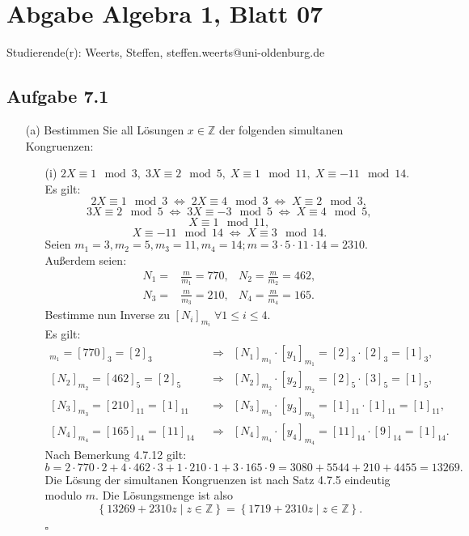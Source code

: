 \documentclass[12pt]{article}
\newcommand{\QED}{\begin{flushright} $\square$ \end{flushright}}
\newcommand{\df}{\enspace\Longrightarrow\enspace}
\newcommand{\gdw}{\;\Longleftrightarrow\;}
\begin{document}
\section*{Abgabe Algebra 1, Blatt 07}

Studierende(r): Weerts, Steffen, steffen.weerts@uni-oldenburg.de

\subsection*{Aufgabe 7.1}
\begin{enumerate}
	\item[(a)] Bestimmen Sie all Lösungen $x\in\mathbb{Z}$ der folgenden simultanen Kongruenzen:
	\begin{enumerate}
		\item[(i)] $2X\equiv 1\mod 3,\;3X\equiv 2\mod 5,\;X\equiv 1\mod 11,\;X\equiv -11\mod 14$. \\
		Es gilt:
		$$2X\equiv 1\mod 3\gdw 2X\equiv 4\mod 3\gdw X\equiv 2\mod 3,$$
		$$3X\equiv 2\mod 5\gdw 3X\equiv -3\mod 5\gdw X\equiv 4\mod 5,$$
		$$X\equiv 1\mod 11,$$
		$$X\equiv -11\mod 14\gdw X\equiv 3\mod 14.$$
		Seien $m_1=3,m_2=5,m_3=11,m_4=14;m=3\cdot 5\cdot 11\cdot 14=2310$. \\
		Außerdem seien:
		\begin{align*}
			N_1=&\frac{m}{m_1}=770, &N_2=\frac{m}{m_2}=462, \\
			N_3=&\frac{m}{m_3}=210, &N_4=\frac{m}{m_4}=165.
		\end{align*}
		Bestimme nun Inverse zu $[N_i]_{m_i}\;\forall 1\leq i\leq 4$. \\
		Es gilt:
		\begin{align*}
			[N_1]_{m_1}=[770]_3=[2]_3&\df[N_1]_{m_1}\cdot[y_1]_{m_1}=[2]_3\cdot[2]_3=[1]_3, \\
			[N_2]_{m_2}=[462]_5=[2]_5&\df[N_2]_{m_2}\cdot[y_2]_{m_2}=[2]_5\cdot[3]_5=[1]_5, \\
			[N_3]_{m_3}=[210]_{11}=[1]_{11}&\df[N_3]_{m_3}\cdot[y_3]_{m_3}=[1]_{11}\cdot[1]_{11}=[1]_{11}, \\
			[N_4]_{m_4}=[165]_{14}=[11]_{14}&\df[N_4]_{m_4}\cdot[y_4]_{m_4}=[11]_{14}\cdot[9]_{14}=[1]_{14}.
		\end{align*}
		Nach Bemerkung 4.7.12 gilt:
		$$b=2\cdot770\cdot2+4\cdot462\cdot3+1\cdot210\cdot1+3\cdot165\cdot9=3080+5544+210+4455=13269.$$
		Die Lösung der simultanen Kongruenzen ist nach Satz 4.7.5 eindeutig modulo $m$. Die Lösungsmenge ist also
		$$\left\{13269+2310z\mid z\in\mathbb{Z}\right\}=\left\{1719+2310z\mid z\in\mathbb{Z}\right\}.$$
		\QED
		

\end{enumerate}
\end{enumerate}
\end{document}
